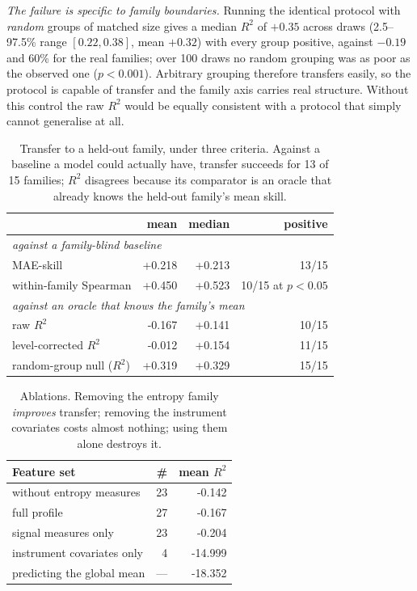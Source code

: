 \documentclass[11pt,a4paper]{article}
\newcommand{\num}[1]{#1}
\begin{document}
\emph{The failure is specific to family boundaries.} Running the identical
protocol with \emph{random} groups of matched size gives a median \(R^2\) of
\(+0.35\) across draws (2.5--97.5\% range \([0.22, 0.38]\), mean \(+0.32\))
with every group positive,
against \(-0.19\) and \num{60}\% for the real families; over \num{100} draws
no random grouping was as poor as the observed one (\(p<0.001\)). Arbitrary
grouping therefore transfers easily, so the protocol is capable of transfer and
the family axis carries real structure. Without this control the raw \(R^2\)
would be equally consistent with a protocol that simply cannot generalise at
all.

\begin{table}[t]
\centering
\caption{Transfer to a held-out family, under three criteria. Against a
baseline a model could actually have, transfer succeeds for \num{13} of
\num{15} families; \(R^2\) disagrees because its comparator is an oracle that
already knows the held-out family's mean skill.}
\label{tab:transfer}
\small
\begin{tabular}{lrrr}
\toprule
 & mean & median & positive \\
\midrule
\multicolumn{4}{l}{\emph{against a family-blind baseline}}\\
MAE-skill                   & \num{+0.218} & \num{+0.213} & 13/15 \\
within-family Spearman      & \num{+0.450} & \num{+0.523} & 10/15 at \(p<0.05\) \\
\midrule
\multicolumn{4}{l}{\emph{against an oracle that knows the family's mean}}\\
raw \(R^2\)                 & \num{-0.167} & \num{+0.141} & 10/15 \\
level-corrected \(R^2\)     & \num{-0.012} & \num{+0.154} & 11/15 \\
\midrule
random-group null (\(R^2\)) & \num{+0.319} & \num{+0.329} & 15/15 \\
\bottomrule
\end{tabular}
\end{table}

\begin{table}[t]
\centering
\caption{Ablations. Removing the entropy family \emph{improves} transfer;
removing the instrument covariates costs almost nothing; using them alone
destroys it.}
\label{tab:ablation}
\small
\begin{tabular}{lrr}
\toprule
Feature set & \# & mean \(R^2\) \\
\midrule
without entropy measures   & 23 & \num{-0.142} \\
full profile               & 27 & \num{-0.167} \\
signal measures only       & 23 & \num{-0.204} \\
instrument covariates only & 4  & \num{-14.999} \\
\midrule
predicting the global mean & --- & \num{-18.352} \\
\bottomrule
\end{tabular}
\end{table}
\end{document}
